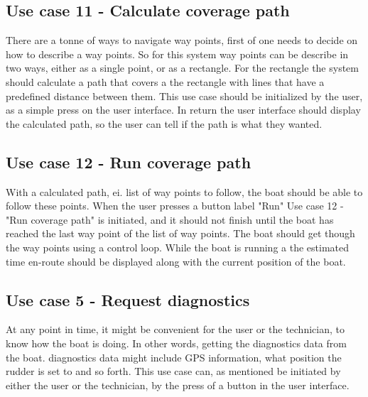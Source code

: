 \subsection{Use case 11 - Calculate coverage path}
There are a tonne of ways to navigate way points, first of one needs to decide on how to describe a way points. So for this system way points can be describe in two ways, either as a single point, or as a rectangle. For the rectangle the system should calculate a path that covers a the rectangle with lines that have a predefined distance between them. This use case should be initialized by the user, as a simple press on the user interface. In return the user interface should display the calculated path, so the user can tell if the path is what they wanted.

\subsection{Use case 12 - Run coverage path}
With a calculated path, ei. list of way points to follow, the boat should be able to follow these points. When the user presses a button label "Run" Use case 12 - "Run coverage path" is initiated, and it should not finish until the boat has reached the last way point of the list of way points. The boat should get though the way points using a control loop. While the boat is running a the estimated time en-route should be displayed along with the current position of the boat.

\subsection{Use case 5 - Request diagnostics}
At any point in time, it might be convenient for the user or the technician, to know how the boat is doing. In other words, getting the diagnostics data from the boat. diagnostics data might include GPS information, what position the rudder is set to and so forth. This use case can, as mentioned be initiated by either the user or the technician, by the press of a button in the user interface. 



